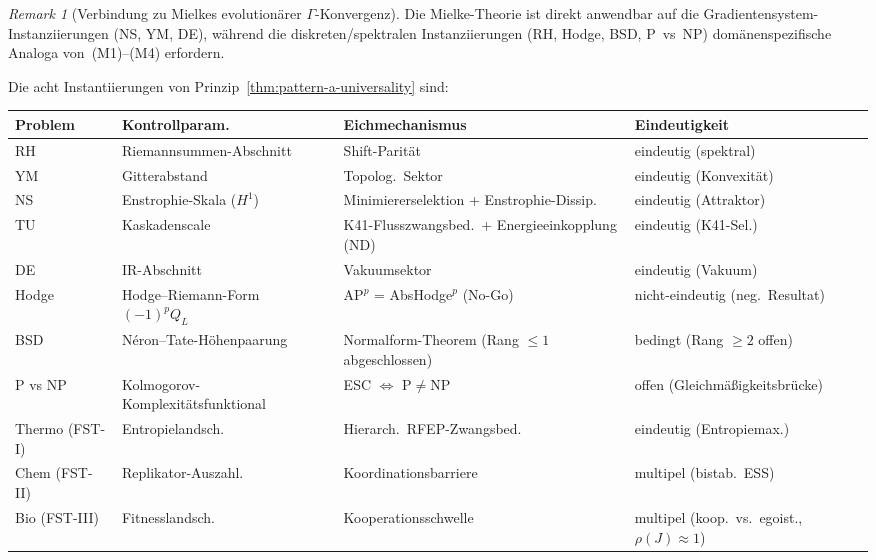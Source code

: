 \documentclass[12pt,a4paper]{article}
\theoremstyle{definition}
\theoremstyle{remark}
\newtheorem{remark}[theorem]{Remark}
\begin{document}
\begin{remark}[Verbindung zu Mielkes evolution\"arer $\Gamma$-Konvergenz]
Die Mielke-Theorie ist direkt anwendbar auf die Gradientensystem-Instanziierungen (NS, YM, DE), w\"ahrend die diskreten/spektralen Instanziierungen (RH, Hodge, BSD, P~vs~NP) dom\"anenspezifische Analoga von~\textup{(M1)--(M4)} erfordern.
\end{remark}

Die acht Instantiierungen von Prinzip~\ref{thm:pattern-a-universality} sind:

\medskip
\begin{center}
\small
\begin{tabular}{p{2.2cm}p{2.5cm}p{5.0cm}p{4.0cm}}
\hline
\textbf{Problem} & \textbf{Kontrollparam.} & \textbf{Eichmechanismus} & \textbf{Eindeutigkeit} \\
\hline
RH    & Riemannsummen-Abschnitt       & Shift-Parität                                      & eindeutig (spektral) \\
YM    & Gitterabstand                 & Topolog.\ Sektor                                   & eindeutig (Konvexität) \\
NS    & Enstrophie-Skala ($H^1$)       & Minimiererselektion + Enstrophie-Dissip.             & eindeutig (Attraktor) \\
TU    & Kaskadenscale                 & K41-Flusszwangsbed.\ + Energieeinkopplung (ND)       & eindeutig (K41-Sel.) \\
DE    & IR-Abschnitt                  & Vakuumsektor                                        & eindeutig (Vakuum) \\
Hodge & Hodge--Riemann-Form $(-1)^p Q_L$ & AP$^p$ = AbsHodge$^p$ (No-Go)                 & nicht-eindeutig (neg.\ Resultat) \cite{Geiger2026-Hodge} \\
BSD   & N\'eron--Tate-Höhenpaarung    & Normalform-Theorem (Rang $\leq 1$ abgeschlossen)    & bedingt (Rang $\geq 2$ offen) \cite{Geiger2026-BSD} \\
P vs NP & Kolmogorov-Komplexitätsfunktional & ESC $\Leftrightarrow$ P$\neq$NP           & offen (Gleichmäßigkeitsbrücke) \cite{Geiger2026-PvsNP} \\
Thermo (FST-I)  & Entropielandsch.      & Hierarch.\ RFEP-Zwangsbed.                          & eindeutig (Entropiemax.) \\
Chem (FST-II)   & Replikator-Auszahl.   & Koordinationsbarriere                               & multipel (bistab.\ ESS) \\
Bio (FST-III)   & Fitnesslandsch.       & Kooperationsschwelle                                & multipel (koop.\ vs.\ egoist., $\rho(J)\!\approx\!1$) \\
\hline
\end{tabular}
\normalsize
\end{center}
\end{document}
